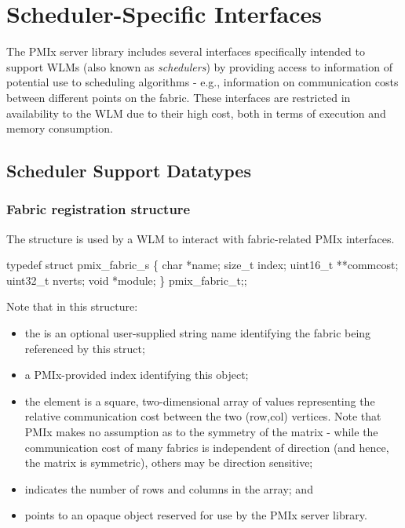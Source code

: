 \chapter{Scheduler-Specific Interfaces}
\label{chap:api_scheduler}

The \ac{PMIx} server library includes several interfaces specifically intended to support \acp{WLM} (also known as \emph{schedulers}) by providing access to information of potential use to scheduling algorithms - e.g., information on communication costs between different points on the fabric. These interfaces are restricted in availability to the \ac{WLM} due to their high cost, both in terms of execution and memory consumption.

\section{Scheduler Support Datatypes}

\subsection{Fabric registration structure}

The  structure is used by a \ac{WLM} to interact with fabric-related \ac{PMIx} interfaces.

\cspecificstart
\begin{codepar}
typedef struct pmix_fabric_s \{
    char *name;
    size_t index;
    uint16_t **commcost;
    uint32_t nverts;
    void *module;
\} pmix_fabric_t;;
\end{codepar}
\cspecificend

Note that in this structure:

\begin{itemize}
    \item the  is an optional user-supplied string name identifying the fabric being referenced by this struct;
    \item a \ac{PMIx}-provided index identifying this object;
    \item the  element is a square, two-dimensional array of  values representing the relative communication cost between the two (row,col) vertices. Note that \ac{PMIx} makes no assumption as to the symmetry of the matrix - while the communication cost of many fabrics is independent of direction (and hence, the  matrix is symmetric), others may be direction sensitive;
    \item {} indicates the number of rows and columns in the  array; and
    \item {} points to an opaque object reserved for use by the \ac{PMIx} server library.
\end{itemize}


